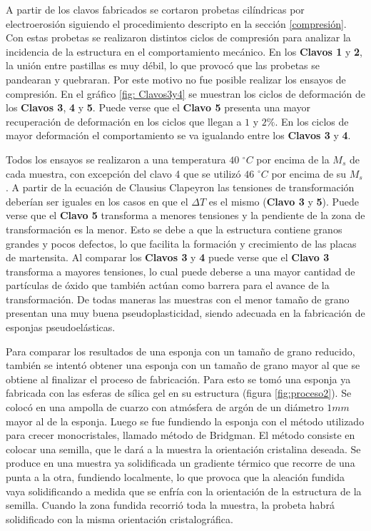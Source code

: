 \documentclass[a4paper,12pt,fleqn,twoside,openany]{book}
\begin{document}
A partir de los clavos fabricados se cortaron probetas cilíndricas por electroerosión siguiendo el procedimiento descripto en la sección \ref{compresión}. Con estas probetas se realizaron distintos ciclos de compresión para analizar la incidencia de la estructura en el comportamiento mecánico. En los \textbf{Clavos 1} y \textbf{2}, la unión entre pastillas es muy débil, lo que provocó que las probetas se pandearan y quebraran. Por este motivo no fue posible realizar los ensayos de compresión. En el gráfico \ref{fig: Clavos3y4} se muestran los ciclos de deformación de los \textbf{Clavos 3}, \textbf{4} y \textbf{5}. Puede verse que el \textbf{Clavo 5} presenta una mayor recuperación de deformación en los ciclos que llegan a $1$ y $2 \%$. En los ciclos de mayor deformación el comportamiento se va igualando entre los \textbf{Clavos 3} y \textbf{4}.

Todos los ensayos se realizaron a una temperatura $40$ $^\circ C$ por encima de la $M_s$ de cada muestra, con excepción del clavo 4 que se utilizó $46$ $^\circ C$ por encima de su $M_s$. A partir de la ecuación de Clausius Clapeyron las tensiones de transformación deberían ser iguales en los casos en que el $\Delta T$ es el mismo (\textbf{Clavo 3} y \textbf{5}). Puede verse que el \textbf{Clavo 5} transforma a menores tensiones y la pendiente de la zona de transformación es la menor. Esto se debe a que la estructura contiene granos grandes y pocos defectos, lo que facilita la formación y crecimiento de las placas de martensita. Al comparar los \textbf{Clavos 3} y \textbf{4} puede verse que el \textbf{Clavo 3} transforma a mayores tensiones, lo cual puede deberse a una mayor cantidad de partículas de óxido que también actúan como barrera para el avance de la transformación. De todas maneras las muestras con el menor tamaño de grano presentan una muy buena pseudoplasticidad, siendo adecuada en la fabricación de esponjas pseudoelásticas.  


Para comparar los resultados de una esponja con un tamaño de grano reducido, también se intentó obtener una esponja con un tamaño de grano mayor al que se obtiene al finalizar el proceso de fabricación. Para esto se tomó una esponja ya fabricada con las esferas de sílica gel en su estructura (figura \ref{fig:proceso2}). Se colocó en una ampolla de cuarzo con atmósfera de argón de un diámetro  $1 mm$ mayor al de la esponja. Luego se fue fundiendo la esponja con el método utilizado para crecer monocristales, llamado método de Bridgman. El método consiste en colocar una semilla, que le dará a la muestra la orientación cristalina deseada. Se produce en una muestra ya solidificada un gradiente térmico que recorre de una punta a la otra, fundiendo localmente, lo que provoca que la aleación fundida vaya solidificando a medida que se enfría con la orientación de la estructura de la semilla. Cuando la zona fundida recorrió toda la muestra, la probeta habrá solidificado con la misma orientación cristalográfica.
\end{document}
